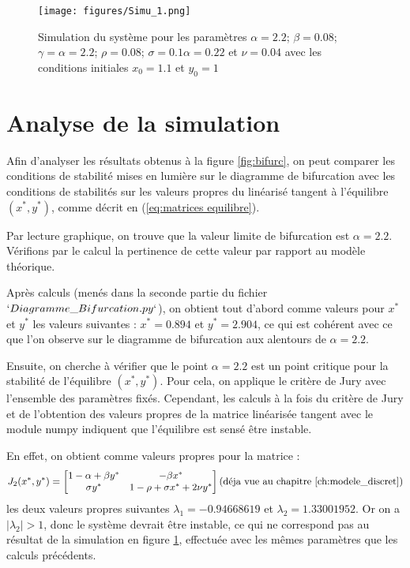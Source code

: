 \begin{figure}
    \begin{center}
		\texttt{[image: figures/Simu\_1.png]}
	\end{center}
	\caption{Simulation du système pour les paramètres $\alpha = 2.2$; $\beta = 0.08$; $\gamma = \alpha = 2.2$; $\rho = 0.08$; $\sigma = 0.1 \alpha = 0.22$ et $\nu = 0.04$ avec les conditions initiales $x_0 = 1.1$ et $y_0 = 1$}
    \label{fig:simu param fixes}
\end{figure}

\section{Analyse de la simulation}

Afin d'analyser les résultats obtenus à la figure \ref{fig:bifurc}, on peut comparer les conditions de stabilité mises en lumière sur le diagramme de bifurcation avec les conditions de stabilités sur les valeurs propres du linéarisé tangent à l'équilibre $(x^*, y^*)$, comme décrit en (\ref{eq:matrices equilibre}).

Par lecture graphique, on trouve que la valeur limite de bifurcation est $\alpha = 2.2$. Vérifions par le calcul la pertinence de cette valeur par rapport au modèle théorique.

Après calculs (menés dans la seconde partie du fichier $`Diagramme\_Bifurcation.py`$), on obtient tout d'abord comme valeurs pour $x^*$ et $y^*$ les valeurs suivantes : $x^* = 0.894$ et $y^* = 2.904$, ce qui est cohérent avec ce que l'on observe sur le diagramme de bifurcation aux alentours de $\alpha = 2.2$.

Ensuite, on cherche à vérifier que le point $\alpha = 2.2$ est un point critique pour la stabilité de l'équilibre $(x^*, y^*)$. Pour cela, on applique le critère de Jury avec l'ensemble des paramètres fixés. Cependant, les calculs à la fois du critère de Jury et de l'obtention des valeurs propres de la matrice linéarisée tangent avec le module numpy indiquent que l'équilibre est sensé être instable.

En effet, on obtient comme valeurs propres pour la matrice :
\begin{equation}
	J_{2}(x^*, y^*) = 
  	\begin{bmatrix}
    	1 - \alpha + \beta y^* & - \beta x^* \\
    	\sigma y^* & 1 - \rho + \sigma x^* + 2 \nu y^*
  	\end{bmatrix}
	\text{(déja vue au chapitre \ref{ch:modele_discret})}
\end{equation}
les deux valeurs propres suivantes $\lambda_1 = -0.94668619$ et $\lambda_2 = 1.33001952$. Or on a $|\lambda_2| > 1$, donc le système devrait être instable, ce qui ne correspond pas au résultat de la simulation en figure \ref{fig:simu param fixes}, effectuée avec les mêmes paramètres que les calculs précédents.

